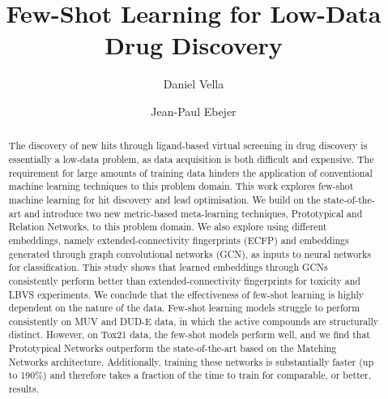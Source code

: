\documentclass[journal=jcisd8,manuscript=article]{achemso} %
\author{Daniel Vella}
\affiliation{Department of Artificial Intelligence, University of Malta, Msida, MSD 2080, Malta.}
\author{Jean-Paul Ebejer}
\affiliation{Department of Artificial Intelligence, University of Malta, Msida, MSD 2080, Malta.}
\title
  {Few-Shot Learning for Low-Data Drug Discovery}
\begin{document}






\begin{abstract}
	The discovery of new hits through ligand-based virtual screening in drug discovery is essentially a low-data problem, as data acquisition is both difficult and expensive. The requirement for large amounts of training data hinders the application of conventional machine learning techniques to this problem domain. This work explores few-shot machine learning for hit discovery and lead optimisation. We build on the state-of-the-art and introduce two new metric-based meta-learning techniques, Prototypical and Relation Networks, to this problem domain. We also explore using different embeddings, namely extended-connectivity fingerprints (ECFP) and embeddings generated through graph convolutional networks (GCN), as inputs to neural networks for classification. This study shows that learned embeddings through GCNs consistently perform better than extended-connectivity fingerprints for toxicity and LBVS experiments. We conclude that the effectiveness of few-shot learning is highly dependent on the nature of the data. Few-shot learning models struggle to perform consistently on MUV and DUD-E data, in which the active compounds are structurally distinct. However, on Tox21 data, the few-shot models perform well, and we find that Prototypical Networks outperform the state-of-the-art based on the Matching Networks architecture. Additionally, training these networks is substantially faster (up to 190\%) and therefore takes a fraction of the time to train for comparable, or better, results.
\end{abstract}
\end{document}
